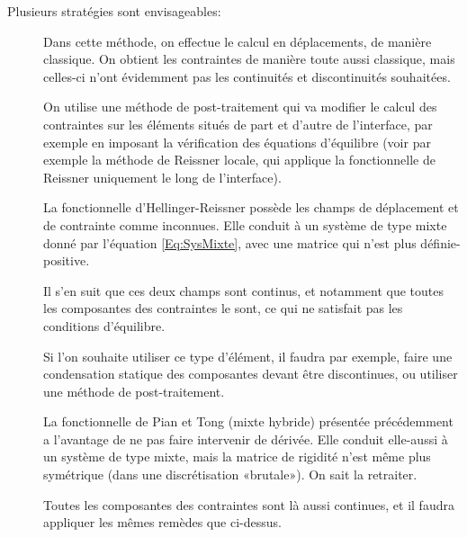 \medskip
Plusieurs stratégies sont envisageables:
\begin{description}
\item[]

	Dans cette méthode, on effectue le calcul en déplacements, de manière classique. On obtient les contraintes de manière toute aussi classique, mais celles-ci 	n'ont évidemment pas les continuités et discontinuités souhaitées.

	On utilise une méthode de post-traitement qui va modifier le calcul des contraintes 	sur les éléments situés de part et d'autre de l'interface, par exemple 	en imposant la vérification des équations d'équilibre (voir par exemple 	la méthode de Reissner locale, qui applique la fonctionnelle de Reissner uniquement 	le long de l'interface).\item[]

	La fonctionnelle d'Hellinger-Reissner possède les champs de déplacement et de 	contrainte comme inconnues. Elle conduit à un système de type mixte donné par l'équation \eqref{Eq:SysMixte}, avec une matrice qui n'est plus définie-positive.

	Il s'en suit que ces deux champs sont continus, et notamment que toutes les 	composantes des contraintes le sont, ce qui ne satisfait pas les conditions d'équilibre.

	Si l'on souhaite utiliser ce type d'élément, il faudra par exemple, faire une condensation statique des composantes devant être discontinues, ou utiliser une méthode de post-traitement.

	\item[]

	La fonctionnelle de Pian et Tong (mixte hybride) présentée précédemment a l'avantage de ne pas faire intervenir de dérivée. Elle conduit elle-aussi à un système de type mixte, mais la matrice de rigidité n'est même plus symétrique (dans une discrétisation «brutale»). On sait la retraiter.

	Toutes les composantes des contraintes sont là aussi continues, et il faudra appliquer les mêmes remèdes que ci-dessus.


\end{description}
